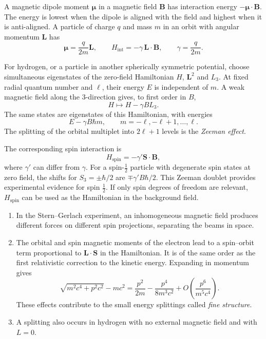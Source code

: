 \documentclass[11pt,a4paper]{article}
\begin{document}
A magnetic dipole moment $\boldsymbol{\mu}$ in a magnetic field
$\mathbf B$ has interaction energy $-\boldsymbol{\mu}\cdot\mathbf B$.
The energy is lowest when the dipole is aligned with the field and
highest when it is anti-aligned. A particle of charge $q$ and mass
$m$ in an orbit with angular momentum $\mathbf L$ has
\[
    \boldsymbol{\mu}=\frac{q}{2m}\mathbf L,
    \qquad
    H_{\mathrm{int}}=-\gamma\,\mathbf L\cdot\mathbf B,
    \qquad
    \gamma=\frac{q}{2m}.
\]

For hydrogen, or a particle in another spherically symmetric
potential, choose simultaneous eigenstates of the zero-field
Hamiltonian $H$, $\mathbf L^2$ and $L_3$. At fixed radial quantum
number and $\ell$, their energy $E$ is independent of $m$. A weak
magnetic field along the 3-direction gives, to first order in $B$,
\[
    H\longmapsto H-\gamma B L_3.
\]
The same states are eigenstates of this Hamiltonian, with energies
\[
    E-\gamma B\hbar m,\qquad m=-\ell,-\ell+1,\ldots,\ell.
\]
The splitting of the orbital multiplet into $2\ell+1$ levels is
the \emph{Zeeman effect}.

The corresponding spin interaction is
\[
    H_{\mathrm{spin}}=-\gamma'\mathbf S\cdot\mathbf B,
\]
where $\gamma'$ can differ from $\gamma$. For a spin-$\frac12$
particle with degenerate spin states at zero field, the shifts
for $S_3=\pm\hbar/2$ are $\mp\gamma'B\hbar/2$. This Zeeman doublet
provides experimental evidence for spin $\frac12$. If only spin
degrees of freedom are relevant, $H_{\mathrm{spin}}$ can be used
as the Hamiltonian in the background field.

\begin{enumerate}
    \item[(i)] In the Stern--Gerlach experiment, an inhomogeneous
    magnetic field produces different forces on different spin
    projections, separating the beams in space.

    \item[(ii)] The orbital and spin magnetic moments of the
    electron lead to a spin--orbit term proportional to
    $\mathbf L\cdot\mathbf S$ in the Hamiltonian. It is of the same
    order as the first relativistic correction to the kinetic
    energy. Expanding in momentum gives
    \[
        \sqrt{m^2c^4+p^2c^2}-mc^2
        =\frac{p^2}{2m}-\frac{p^4}{8m^3c^2}
         +O\!\left(\frac{p^6}{m^5c^4}\right).
    \]
    These effects contribute to the small energy splittings called
    \emph{fine structure}.

    \item[(iii)] A splitting also occurs in hydrogen with no
    external magnetic field and with $L=0$.
\end{enumerate}
\end{document}

